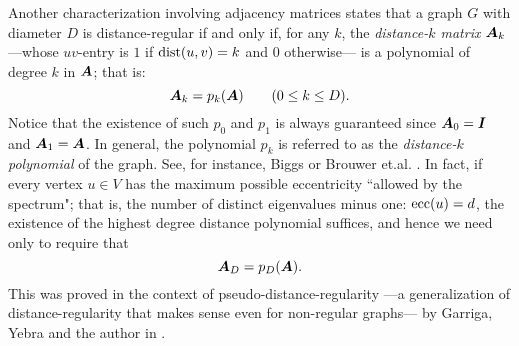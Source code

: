 \documentclass[11pt]{article}
\def\A{\mbox{\boldmath $A$}}
\def\I{\mbox{\boldmath $I$}}
\def\dist{\mathop{\rm dist}\nolimits}
\def\ecc{\mathop{\rm ecc}\nolimits}
\begin{document}
Another characterization involving adjacency matrices states that
a graph  $G$ with  diameter
$D$ is   distance-regular if and only if, for any $k$, the {\it
distance-$k$ matrix}
$\A_k$ ---whose $uv$-entry is $1$ if $\dist(u,v)=k$ and $0$
otherwise--- is a polynomial of degree $k$ in $\A$; that is:
\begin{equation}
\label{all-dist-pol}
\A_k=p_k(\A)\qquad (0\le k\le D).
\end{equation}
Notice that the existence of such $p_0$ and $p_1$ is always
guaranteed since $\A_0=\I$ and $\A_1=\A$. 
In general, the polynomial
$p_k$ is referred to as the {\it distance-$k$ polynomial} of the
graph. See,  for instance, Biggs \cite{b93} or Brouwer et.al.
\cite{bcn89}. In fact, if  every vertex $u\in V$ has the maximum
possible eccentricity ``allowed by the spectrum"; that is, the number
of distinct eigenvalues minus one: $\ecc(u)=d$, the existence of the
highest degree distance polynomial suffices, and hence we 
need only to require that
\begin{equation}
\label{D-dist-pol}
 \A_D=p_D(\A).
\end{equation}
This was proved in the context of pseudo-distance-regularity
---a generalization of distance-regularity that makes sense even for
non-regular graphs--- by Garriga, Yebra and the author in
\cite{fgy96-2}. 
\end{document}
